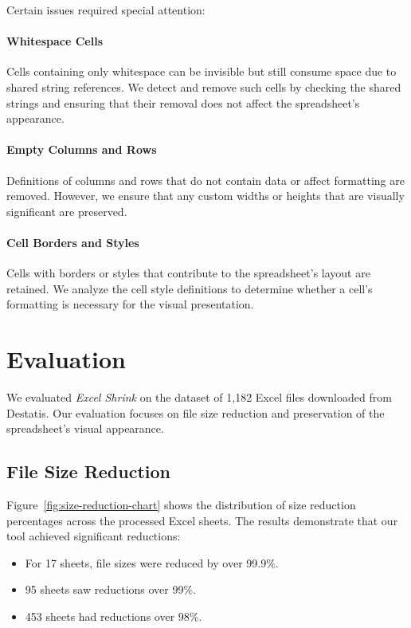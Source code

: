 \documentclass[sigconf]{acmart}
\begin{document}
Certain issues required special attention:

\paragraph{Whitespace Cells}

Cells containing only whitespace can be invisible but still consume space due to shared string references. We detect and remove such cells by checking the shared strings and ensuring that their removal does not affect the spreadsheet's appearance.

\paragraph{Empty Columns and Rows}

Definitions of columns and rows that do not contain data or affect formatting are removed. However, we ensure that any custom widths or heights that are visually significant are preserved.

\paragraph{Cell Borders and Styles}

Cells with borders or styles that contribute to the spreadsheet's layout are retained. We analyze the cell style definitions to determine whether a cell's formatting is necessary for the visual presentation.

\section{Evaluation}
\label{sec:evaluation}

We evaluated \textit{Excel Shrink} on the dataset of 1,182 Excel files downloaded from Destatis. Our evaluation focuses on file size reduction and preservation of the spreadsheet's visual appearance.

\subsection{File Size Reduction}

Figure~\ref{fig:size-reduction-chart} shows the distribution of size reduction percentages across the processed Excel sheets. The results demonstrate that our tool achieved significant reductions:

\begin{itemize}
    \item For 17 sheets, file sizes were reduced by over 99.9\%.
    \item 95 sheets saw reductions over 99\%.
    \item 453 sheets had reductions over 98\%.
\end{itemize}
\end{document}
